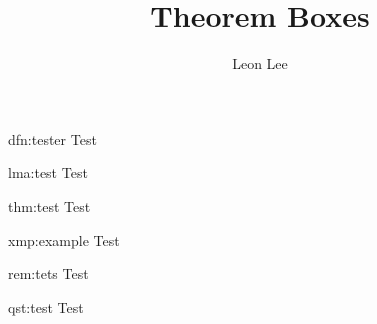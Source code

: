 \documentclass{article}
\title{Theorem Boxes}
\author{Leon Lee}
\begin{document}
\maketitle

\begin{dfn}[test]{dfn:tester}{}
    Test
\end{dfn}

\begin{lma}[Test]{lma:test}{}
    Test
\end{lma}

\begin{thm}[Test]{thm:test}{}
    Test
\end{thm}

\begin{xmp}[Test]{xmp:example}{}
    Test
\end{xmp}

\begin{rem}[Test]{rem:tets}{}
    Test
\end{rem}

\begin{qst}[Test]{qst:test}{}
    Test
\end{qst}
\end{document}
